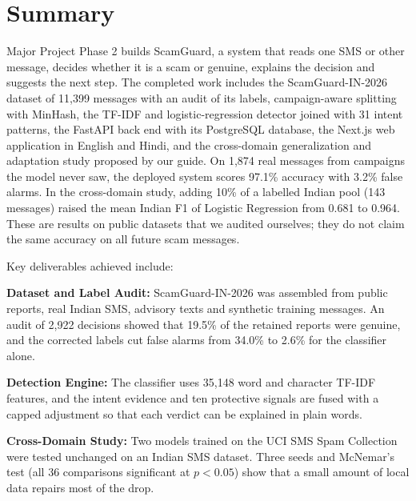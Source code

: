 \chapter*{Summary}
Major Project Phase 2 builds ScamGuard, a system that reads one SMS or other message, decides whether it is a scam or genuine, explains the decision and suggests the next step. The completed work includes the ScamGuard-IN-2026 dataset of 11,399 messages with an audit of its labels, campaign-aware splitting with MinHash, the TF-IDF and logistic-regression detector joined with 31 intent patterns, the FastAPI back end with its PostgreSQL database, the Next.js web application in English and Hindi, and the cross-domain generalization and adaptation study proposed by our guide. On 1,874 real messages from campaigns the model never saw, the deployed system scores 97.1\% accuracy with 3.2\% false alarms. In the cross-domain study, adding 10\% of a labelled Indian pool (143 messages) raised the mean Indian F1 of Logistic Regression from 0.681 to 0.964. These are results on public datasets that we audited ourselves; they do not claim the same accuracy on all future scam messages.

Key deliverables achieved include:

\textbf{Dataset and Label Audit:} ScamGuard-IN-2026 was assembled from public reports, real Indian SMS, advisory texts and synthetic training messages. An audit of 2,922 decisions showed that 19.5\% of the retained reports were genuine, and the corrected labels cut false alarms from 34.0\% to 2.6\% for the classifier alone.

\textbf{Detection Engine:} The classifier uses 35,148 word and character TF-IDF features, and the intent evidence and ten protective signals are fused with a capped adjustment so that each verdict can be explained in plain words.

\textbf{Cross-Domain Study:} Two models trained on the UCI SMS Spam Collection were tested unchanged on an Indian SMS dataset. Three seeds and McNemar's test (all 36 comparisons significant at $p<0.05$) show that a small amount of local data repairs most of the drop.

